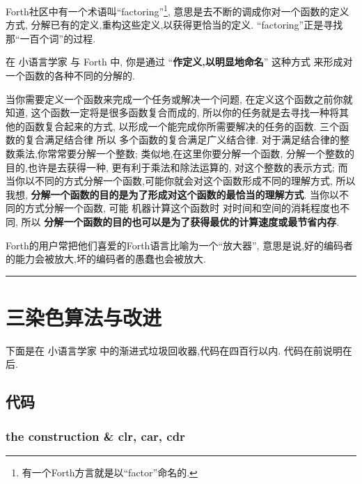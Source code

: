 \documentclass[a4paper]{article}
\begin{document}
Forth社区中有一个术语叫``factoring''\footnote{有一个Forth方言就是以``factor''命名的.},
意思是去不断的调成你对一个函数的定义方式,
分解已有的定义,重构这些定义,以获得更恰当的定义.
``factoring''正是寻找那``一百个词''的过程.

在 小语言学家 与 Forth 中,
你是通过 ``\textbf{作定义,以明显地命名}'' 这种方式
来形成对一个函数的各种不同的分解的.

当你需要定义一个函数来完成一个任务或解决一个问题,
在定义这个函数之前你就知道,
这个函数一定将是很多函数复合而成的,
所以你的任务就是去寻找一种将其他的函数复合起来的方式,
以形成一个能完成你所需要解决的任务的函数.
三个函数的复合满足结合律 所以 多个函数的复合满足广义结合律.
对于满足结合律的整数乘法,你常常要分解一个整数;
类似地,在这里你要分解一个函数,
分解一个整数的目的,也许是去获得一种, 更有利于乘法和除法运算的, 对这个整数的表示方式;
而当你以不同的方式分解一个函数,可能你就会对这个函数形成不同的理解方式,
所以我想, \textbf{分解一个函数的目的是为了形成对这个函数的最恰当的理解方式}.
当你以不同的方式分解一个函数,
可能 机器计算这个函数时 对时间和空间的消耗程度也不同,
所以 \textbf{分解一个函数的目的也可以是为了获得最优的计算速度或最节省内存}.

Forth的用户常把他们喜爱的Forth语言比喻为一个``放大器'',
意思是说,好的编码者的能力会被放大,坏的编码者的愚蠢也会被放大.


\vspace{.5cm}\hrule\vspace{.5cm}


 \newpage



\section{三染色算法与改进}

下面是在 小语言学家 中的渐进式垃圾回收器,代码在四百行以内.
代码在前说明在后.

\subsection{代码}

\subsubsection{the construction \& clr, car, cdr}
\end{document}
